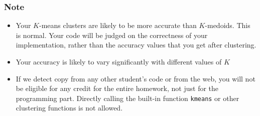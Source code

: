 \documentclass[11pt,epic]{article}
\begin{document}
\subsubsection*{Note}
\begin{itemize}
    \item Your $K$-means clusters are likely to be more accurate than $K$-medoids. This is normal. Your code will be judged on the correctness of your implementation, rather than the accuracy values that you get after clustering.
    \item Your accuracy is likely to vary significantly with different values of $K$
    \item If we detect copy from any other student's code or from the web, you will not be eligible for any credit for the entire homework, not just for the programming part. Directly calling the built-in function \texttt{kmeans} or other clustering functions is not allowed.
\end{itemize}
\end{document}

